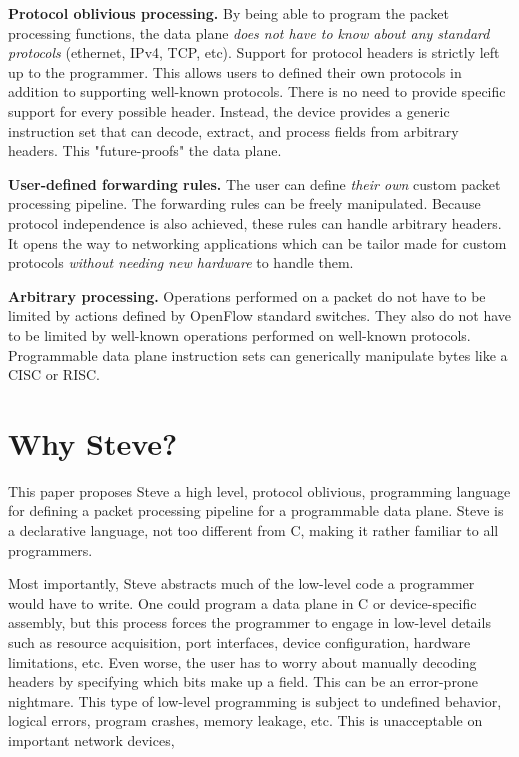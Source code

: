 \textbf{Protocol oblivious processing.} By being able to program the packet processing functions, the data plane \textit{does not have to know about any standard protocols} (ethernet, IPv4, TCP, etc). Support for protocol headers is strictly left up to the programmer. This allows users to defined their own protocols in addition to supporting well-known protocols. There is no need to provide specific support for every possible header. Instead, the device provides a generic instruction set that can decode, extract, and process fields from arbitrary headers. This "future-proofs" the data plane.

\textbf{User-defined forwarding rules.} The user can define \textit{their own} custom packet processing pipeline. The forwarding rules can be freely manipulated. Because protocol independence is also achieved, these rules can handle arbitrary headers. It opens the way to networking applications which can be tailor made for custom protocols \textit{without needing new hardware} to handle them.

\textbf{Arbitrary processing.} Operations performed on a packet do not have to be limited by actions defined by OpenFlow standard switches. They also do not have to be limited by well-known operations performed on well-known protocols. Programmable data plane instruction sets can generically manipulate bytes like a CISC or RISC.

\section{Why Steve?}

This paper proposes Steve a high level, protocol oblivious, programming language for defining a packet processing pipeline for a programmable data plane. Steve is a declarative language, not too different from C, making it rather familiar to all programmers.

Most importantly, Steve abstracts much of the low-level code a programmer would have to write. One could program a data plane in C or device-specific assembly, but this process forces the programmer to engage in low-level details such as resource acquisition, port interfaces, device configuration, hardware limitations, etc. Even worse, the user has to worry about manually decoding headers by specifying which bits make up a field. This can be an error-prone nightmare. This type of low-level programming is subject to undefined behavior, logical errors, program crashes, memory leakage, etc. This is unacceptable on important network devices,

